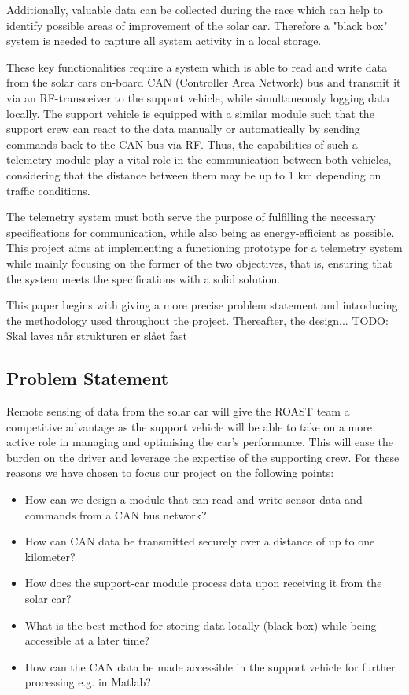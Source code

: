 \documentclass[conference]{IEEEtran}
\newcommand{\todo}[1]{{\color{olive} TODO: #1}}
\begin{document}
Additionally, valuable data can be collected during the race which can help to identify possible areas of improvement of the solar car. Therefore a "black box" system is needed to capture all system activity in a local storage.

These key functionalities require a system which is able to read and write data from the solar cars on-board CAN (Controller Area Network) bus and transmit it via an RF-transceiver to the support vehicle, while simultaneously logging data locally. The support vehicle is equipped with a similar module such that the support crew can react to the data manually or automatically by sending commands back to the CAN bus via RF. Thus, the capabilities of such a telemetry module play a vital role in the communication between both vehicles, considering that the distance between them may be up to 1 km depending on traffic conditions.

The telemetry system must both serve the purpose of fulfilling the necessary specifications for communication, while also being as energy-efficient as possible. This project aims at implementing a functioning prototype for a telemetry system while mainly focusing on the former of the two objectives, that is, ensuring that the system meets the specifications with a solid solution.

This paper begins with giving a more precise problem statement and introducing the methodology used throughout the project. Thereafter, the design... \todo{Skal laves når strukturen er slået fast}

\subsection{Problem Statement}
Remote sensing of data from the solar car will give the ROAST team a competitive advantage as the support vehicle will be able to take on a more active role in managing and optimising the car's performance. This will ease the burden on the driver and leverage the expertise of the supporting crew. For these reasons we have chosen to focus our project on the following points:
\begin{itemize}
    \item How can we design a module that can read and write sensor data and commands from a CAN bus network? 
    \item How can CAN data be transmitted securely over a distance of up to one kilometer?
    \item How does the support-car module process data upon receiving it from the solar car?
    \item What is the best method for storing data locally (black box) while being accessible at a later time?
    \item How can the CAN data be made accessible in the support vehicle for further processing e.g. in Matlab?
\end{itemize}
\end{document}
